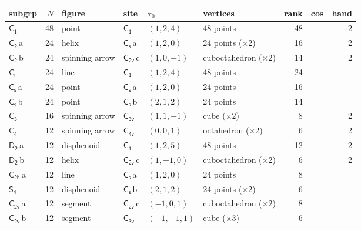 \documentclass[10pt,a4paper]{article}
\numberwithin{equation}{section}
\newcommand{\grp}[1]{\mathsf{#1}}
\newcommand{\clsletter}[1]{\,{\scriptsize\color{black!55}#1}}
\newcommand{\pointr}{\mathbf{r}}
\newlength{\fillwidth}\newlength{\cellwidth}\newlength{\colwidth}
\begin{document}
{{\begin{longtable}{@{}lrllllr>{\RaggedRight\arraybackslash}p{\fillwidth}r@{}}
subgrp & $N$ & figure & site & $\pointr_0$ & vertices & rank & cos & hand\\\midrule\endhead
\bottomrule\endfoot\endlastfoot
\href{C1.pdf}{$\grp{C_{1}}$} & 48 & point & \href{C1.pdf}{$\grp{C_{1}}$} & $(1, 2, 4)$ & 48 points & 48 &  & 2\\*
\href{C2.pdf}{$\grp{C_{2}}$}\clsletter{a} & 24 & helix & \href{C1v.pdf}{$\grp{C_{s}}$}\clsletter{a} & $(1, 2, 0)$ & 24 points (${\times}2$) & 16 &  & 2\\
\href{C2.pdf}{$\grp{C_{2}}$}\clsletter{b} & 24 & spinning arrow & \href{C2v.pdf}{$\grp{C_{2v}}$}\clsletter{c} & $(1, 0, -1)$ & cuboctahedron (${\times}2$) & 14 &  & 2\\
\href{S2.pdf}{$\grp{C_{i}}$} & 24 & line & \href{C1.pdf}{$\grp{C_{1}}$} & $(1, 2, 4)$ & 48 points & 24 &  & \\
\href{C1v.pdf}{$\grp{C_{s}}$}\clsletter{a} & 24 & point & \href{C1v.pdf}{$\grp{C_{s}}$}\clsletter{a} & $(1, 2, 0)$ & 24 points & 16 &  & \\
\href{C1v.pdf}{$\grp{C_{s}}$}\clsletter{b} & 24 & point & \href{C1v.pdf}{$\grp{C_{s}}$}\clsletter{b} & $(2, 1, 2)$ & 24 points & 14 &  & \\
\href{C3.pdf}{$\grp{C_{3}}$} & 16 & spinning arrow & \href{C3v.pdf}{$\grp{C_{3v}}$} & $(1, 1, -1)$ & cube (${\times}2$) & 8 &  & 2\\
\href{C4.pdf}{$\grp{C_{4}}$} & 12 & spinning arrow & \href{C4v.pdf}{$\grp{C_{4v}}$} & $(0, 0, 1)$ & octahedron (${\times}2$) & 6 &  & 2\\
\href{D2.pdf}{$\grp{D_{2}}$}\clsletter{a} & 12 & disphenoid & \href{C1.pdf}{$\grp{C_{1}}$} & $(1, 2, 5)$ & 48 points & 12 &  & 2\\
\href{D2.pdf}{$\grp{D_{2}}$}\clsletter{b} & 12 & helix & \href{C2v.pdf}{$\grp{C_{2v}}$}\clsletter{c} & $(1, -1, 0)$ & cuboctahedron (${\times}2$) & 6 &  & 2\\
\href{C2h.pdf}{$\grp{C_{2h}}$}\clsletter{a} & 12 & line & \href{C1v.pdf}{$\grp{C_{s}}$}\clsletter{a} & $(1, 2, 0)$ & 24 points & 8 &  & \\
\href{S4.pdf}{$\grp{S_{4}}$} & 12 & disphenoid & \href{C1v.pdf}{$\grp{C_{s}}$}\clsletter{b} & $(2, 1, 2)$ & 24 points (${\times}2$) & 6 &  & \\
\href{C2v.pdf}{$\grp{C_{2v}}$}\clsletter{a} & 12 & segment & \href{C2v.pdf}{$\grp{C_{2v}}$}\clsletter{c} & $(-1, 0, 1)$ & cuboctahedron (${\times}2$) & 8 &  & \\
\href{C2v.pdf}{$\grp{C_{2v}}$}\clsletter{b} & 12 & segment & \href{C3v.pdf}{$\grp{C_{3v}}$} & $(-1, -1, 1)$ & cube (${\times}3$) & 6 &  & \\

\end{longtable}}}
\end{document}

